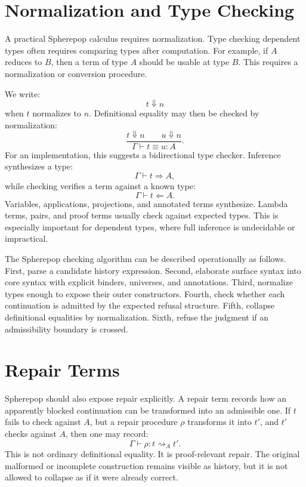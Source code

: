 \documentclass[12pt,oneside]{article}
\newcommand{\eval}{\Downarrow}
\newcommand{\judges}{\vdash}
\newcommand{\defeq}{\equiv}
\begin{document}
\section{Normalization and Type Checking}

A practical Spherepop calculus requires normalization. Type checking dependent types often requires comparing types after computation. For example, if $A$ reduces to $B$, then a term of type $A$ should be usable at type $B$. This requires a normalization or conversion procedure.

We write:
\[
t \eval n
\]
when $t$ normalizes to $n$. Definitional equality may then be checked by normalization:
\[
\frac{t \eval n \qquad u \eval n}
{\Gamma \judges t \defeq u : A}.
\]
For an implementation, this suggests a bidirectional type checker. Inference synthesizes a type:
\[
\Gamma \judges t \Rightarrow A,
\]
while checking verifies a term against a known type:
\[
\Gamma \judges t \Leftarrow A.
\]
Variables, applications, projections, and annotated terms synthesize. Lambda terms, pairs, and proof terms usually check against expected types. This is especially important for dependent types, where full inference is undecidable or impractical.

The Spherepop checking algorithm can be described operationally as follows. First, parse a candidate history expression. Second, elaborate surface syntax into core syntax with explicit binders, universes, and annotations. Third, normalize types enough to expose their outer constructors. Fourth, check whether each continuation is admitted by the expected refusal structure. Fifth, collapse definitional equalities by normalization. Sixth, refuse the judgment if an admissibility boundary is crossed.

\section{Repair Terms}

Spherepop should also expose repair explicitly. A repair term records how an apparently blocked continuation can be transformed into an admissible one. If $t$ fails to check against $A$, but a repair procedure $\rho$ transforms it into $t'$, and $t'$ checks against $A$, then one may record:
\[
\Gamma \judges \rho : t \rightsquigarrow_A t'.
\]
This is not ordinary definitional equality. It is proof-relevant repair. The original malformed or incomplete construction remains visible as history, but it is not allowed to collapse as if it were already correct.
\end{document}
